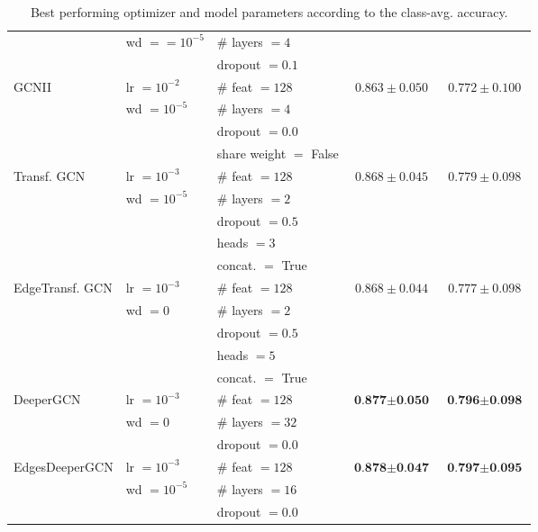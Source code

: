 \documentclass[10pt,twocolumn,letterpaper]{article}
\begin{document}
\begin{table*}[h]
\begin{tabular}{@{}lllcc@{}}
              & wd $==10^{-5}$ & \# layers $= 4$ &\\
              &               & dropout $= 0.1$   &\\
    \midrule
    GCNII \cite{hamilton2017inductive} & lr $=10^{-2}$ & \# feat $= 128$      &$0.863 \pm 0.050$ & $0.772 \pm 0.100$ \\
          & wd $=10^{-5}$ & \# layers $= 4$      &\\
          &               & dropout $= 0.0$        &\\
          &               & share weight $=$ False &\\
    \midrule
    Transf. GCN \cite{shi2020masked} & lr $=10^{-3}$ & \# feat $= 128$      &$0.868 \pm 0.045$ & $0.779 \pm 0.098$ \\
                & wd $=10^{-5}$ & \# layers $= 2$      &\\
                &               & dropout $= 0.5$   &\\
                &               & heads $= 3$       &\\
                &               & concat. $=$ True  &\\
    \midrule
    EdgeTransf. GCN \cite{shi2020masked} & lr $=10^{-3}$ & \# feat $= 128$      &$0.868 \pm 0.044$ & $0.777 \pm 0.098$ \\
                    & wd $=0$ & \# layers $= 2$      &\\
                    &               & dropout $= 0.5$   &\\
                    &               & heads $= 5$       &\\
                    &               & concat. $=$ True  &\\
    \midrule
    DeeperGCN \cite{li2020deepergcn} & lr $=10^{-3}$ & \# feat $= 128$      &$\textbf{0.877} \pm \textbf{0.050}$ & $\textbf{0.796} \pm \textbf{0.098}$ \\ 
              & wd $=0$ & \# layers $= 32$      &\\
              &               & dropout $= 0.0$        &\\
    \midrule
    EdgesDeeperGCN \cite{li2020deepergcn} & lr $=10^{-3}$ & \# feat $= 128$      & $\textbf{0.878} \pm \textbf{0.047}$ & $\textbf{0.797} \pm \textbf{0.095}$ \\
                   & wd $=10^{-5}$       & \# layers $= 16$      &\\
                   &               & dropout $= 0.0$        &\\
    \bottomrule
  \end{tabular}
  \caption{Best performing optimizer and model parameters according to the class-avg. accuracy.}
  \label{tab:full_results}
\end{table*}
\end{document}
